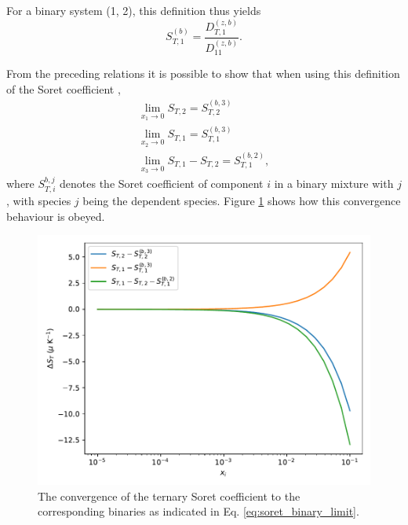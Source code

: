 For a binary system (1, 2), this definition thus yields
\begin{equation}
    S_{T, 1}^{(b)} = \frac{D_{T, 1}^{(z, b)}}{D_{11}^{(z, b)}}.
\end{equation}

From the preceding relations it is possible to show that when using this definition of the Soret coefficient \cite{ortiz2019definition},
\begin{equation}
    \begin{split}
        \lim_{x_1 \to 0} S_{T, 2} = S_{T, 2}^{(b, 3)} \\
        \lim_{x_2 \to 0} S_{T, 1} = S_{T, 1}^{(b, 3)} \\
        \lim_{x_3 \to 0} S_{T, 1} - S_{T, 2} = S_{T, 1}^{(b, 2)},
    \end{split}
    \label{eq:soret_binary_limit}
\end{equation}
where $S_{T, i}^{b, j}$ denotes the Soret coefficient of component $i$ in a binary mixture with $j$, with species $j$ being the dependent species. Figure \ref{fig:soret_binary_limit} shows how this convergence behaviour is obeyed.

\begin{figure}
    \centering
    \includegraphics[width=.85\textwidth]{soret_limit.pdf}
    \caption{The convergence of the ternary Soret coefficient to the corresponding binaries as indicated in Eq. \eqref{eq:soret_binary_limit}.}
    \label{fig:soret_binary_limit}
\end{figure}